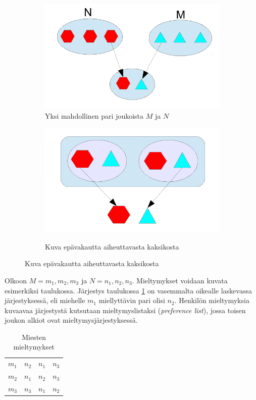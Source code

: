 \documentclass[finnish]{tktltiki2}
\theoremstyle{definition}
\theoremstyle{remark}
\begin{document}
\begin{figure}[t]
	\begin{subfigure}{.6\textwidth}
	\includegraphics[scale=0.6]{paritutk}
	\caption{Yksi mahdollinen pari joukoista $M$ ja $N$}
	\end{subfigure}
	\begin{subfigure}{.3\textwidth}
	\includegraphics[scale=0.6]{vakaatutk}\label{epävakaa}
	\caption{Kuva epävakautta aiheuttavasta kaksikosta}
	\end{subfigure}
\end{figure}


Olkoon $M = {m_1, m_2, m_3}$ ja $N = {n_1, n_2, n_3}$. Mieltymykset voidaan kuvata esimerkiksi taulukossa. Järjestys taulukossa \ref{mieltymyksettaul} on vasemmalta oikealle laskevassa järjestyksessä, eli miehelle $m_1$ miellyttävin pari olisi $n_2$. Henkilön mieltymyksia kuvaavaa järjestystä kutsutaan mieltymyslistaksi (\emph{preference list}), jossa toisen joukon alkiot ovat mieltymysjärjestyksessä.
\begin{table}[t]\label{mieltymyksettaul}
\begin{center}
	\begin{tabular}{ l | *{2}{c} r }
	 &  \\
	 \hline
 	 $m_{1}$ & $n_{2}$ & $n_{1}$ & $n_{3}$ \\
 	 $m_{2}$ & $n_{1}$ & $n_{2}$ & $n_{3}$ \\
 	 $m_{3}$ & $n_{3}$ & $n_{1}$ & $n_{2}$ \\
	\end{tabular}
	\caption{Miesten mieltymykset}
\end{center}
\end{table}
\end{document}
